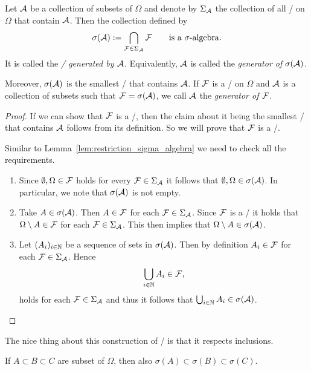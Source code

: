 \begin{proposition}\label{prop:generated_sigalg}
Let $\mathcal A$ be a collection of subsets of $\Omega$ and denote by $\Sigma_{\mathcal A}$ the collection of all \sigalgs/ on $\Omega$ that contain $\mathcal A$. Then the collection defined by
\[
	\sigma(\cA) := \bigcap_{\cF \in \Sigma_\cA} \cF\qquad\text{is a \sigalg/.}
\]
It is called the \emph{\sigalg/ generated by $\mathcal A$}. Equivalently, $\mathcal A$ is called the \emph{generator of $\sigma(\mathcal A)$}.

Moreover, $\sigma(\mathcal A)$ is the smallest \sigalg/ that contains $\mathcal A$. If $\mathcal F$ is a \sigalg/ on $\Omega$ and $\mathcal A$ is a collection of subsets such that $\mathcal F = \sigma(\mathcal A)$, we call $\mathcal A$ the \emph{generator of $\mathcal F$}. 
\end{proposition}

\begin{proof}
If we can show that $\mathcal F$ is a \sigalg/, then the claim about it being the smallest \sigalg/ that contains $\mathcal A$ follows from its definition. So we will prove that $\mathcal F$ is a \sigalg/.

Similar to Lemma~\ref{lem:restriction_sigma_algebra} we need to check all the requirements.
\begin{enumerate}
\item Since $\emptyset, \Omega \in \mathcal F$ holds for every $\mathcal F \in \Sigma_{\mathcal A}$ it follows that $\emptyset, \Omega \in \sigma(\mathcal A)$. In particular, we note that $\sigma(\mathcal A)$ is not empty.
\item Take $A \in \sigma(\mathcal A)$. Then $A \in \mathcal F$ for each $\mathcal F \in \Sigma_{\mathcal A}$. Since $\mathcal F$ is a \sigalg/ it holds that $\Omega \setminus A \in \mathcal F$ for each $\mathcal F \in \Sigma_{\mathcal A}$. This then implies that $\Omega \setminus A \in \sigma(\mathcal A)$.
\item Let $(A_i)_{i \in \mathbb N}$ be a sequence of sets in $\sigma(\mathcal A)$. Then by definition $A_i \in \mathcal F$ for each $\mathcal F \in \Sigma_{\mathcal A}$. Hence
\[
	\bigcup_{i \in \mathbb N} A_i \in \mathcal F,
\] 
holds for each $\mathcal F \in \Sigma_{\mathcal A}$ and thus it follows that $\bigcup_{i \in \mathbb N} A_i \in \sigma(\mathcal A)$.\qedhere
\end{enumerate}
\end{proof}

The nice thing about this construction of \sigalgs/ is that it respects inclusions.

\begin{lemma}\label{lem:inclusion_sigalgs}
If $A \subset B \subset C$ are subset of $\Omega$, then also $\sigma(A) \subset \sigma(B) \subset \sigma(C)$.
\end{lemma}

